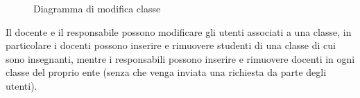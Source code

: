 \documentclass[a4paper, titlepage]{article}
\begin{document}
\newpage
{}
\begin{figure}[H]
	\centering
	\noindent{}
	\caption{Diagramma di modifica classe}
\end{figure}
Il docente e il responsabile possono modificare gli utenti associati a una classe, in particolare i docenti possono inserire e rimuovere studenti di una classe di cui sono insegnanti, mentre i responsabili possono inserire e rimuovere docenti in ogni classe del proprio ente (senza che venga inviata una richiesta da parte degli utenti). 

\newpage
\end{document}
